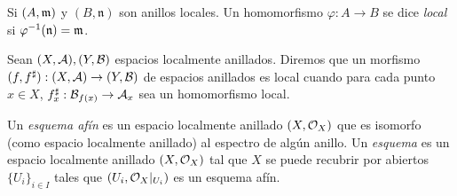 \documentclass[GA.tex]{subfiles}
\begin{document}
\begin{defi}
Si $(A, {\mathfrak{m}})$ y $(B,\mathfrak{n})$ son anillos locales. Un homomorfismo $\varphi:A\to B$ se dice \emph{local} si $\varphi^{-1}(\mathfrak{n})={\mathfrak{m}}$. 
\end{defi}

\begin{defi}
Sean $(X,\mathcal{A}), (Y,\mathcal{B})$ espacios localmente anillados. Diremos que un morfismo $(f,f^{\sharp}):(X,\mathcal{A})\to (Y,\mathcal{B})$ de espacios anillados es local cuando para cada punto $x\in X$, $f^{\sharp}_x:\mathcal{B}_{f(x)}\to\mathcal{A}_x$ sea un homomorfismo local. 
\end{defi}

\begin{defi}
Un \emph{esquema afín} es un espacio localmente anillado $(X,{\mathcal O}_X)$ que es isomorfo (como espacio localmente anillado) al espectro de algún anillo. Un \emph{esquema} es un espacio localmente anillado $(X,{\mathcal O}_X)$ tal que $X$ se puede recubrir por abiertos $\{U_i\}_{i\in I}$ tales que $(U_i,{\mathcal O}_X|_{U_i})$ es un esquema afín. 
\end{defi}
\end{document}
